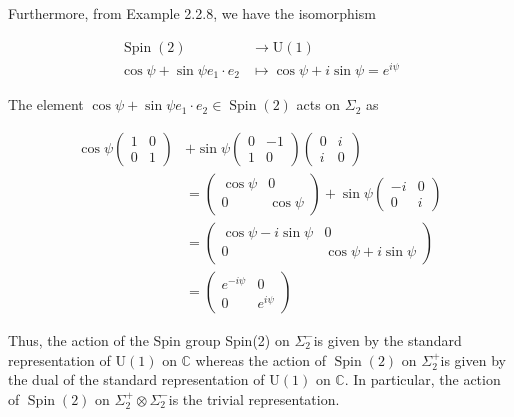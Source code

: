 \documentclass[10pt, letterpaper]{article}
\begin{document}
Furthermore, from Example 2.2.8, we have the isomorphism

$$
\begin{aligned}
\operatorname{Spin}(2) & \rightarrow \mathrm{U}(1) \\
\cos \psi+\sin \psi e_{1} \cdot e_{2} & \mapsto \cos \psi+i \sin \psi=e^{i \psi}
\end{aligned}
$$

The element $\cos \psi+\sin \psi e_{1} \cdot e_{2} \in \operatorname{Spin}(2)$ acts on $\Sigma_{2}$ as

$$
\begin{aligned}
\cos \psi\left(\begin{array}{ll}
1 & 0 \\
0 & 1
\end{array}\right) & +\sin \psi\left(\begin{array}{cc}
0 & -1 \\
1 & 0
\end{array}\right)\left(\begin{array}{ll}
0 & i \\
i & 0
\end{array}\right) \\
& =\left(\begin{array}{cc}
\cos \psi & 0 \\
0 & \cos \psi
\end{array}\right)+\sin \psi\left(\begin{array}{cc}
-i & 0 \\
0 & i
\end{array}\right) \\
& =\left(\begin{array}{cc}
\cos \psi-i \sin \psi & 0 \\
0 & \cos \psi+i \sin \psi
\end{array}\right) \\
& =\left(\begin{array}{cc}
e^{-i \psi} & 0 \\
0 & e^{i \psi}
\end{array}\right)
\end{aligned}
$$

Thus, the action of the Spin group Spin(2) on $\Sigma_{2}^{-}$is given by the standard representation of $\mathrm{U}(1)$ on $\mathbb{C}$ whereas the action of $\operatorname{Spin}(2)$ on $\Sigma_{2}^{+}$is given by the dual of the standard representation of $\mathrm{U}(1)$ on $\mathbb{C}$. In particular, the action of $\operatorname{Spin}(2)$ on $\Sigma_{2}^{+} \otimes \Sigma_{2}^{-}$is the trivial representation.
\end{document}

